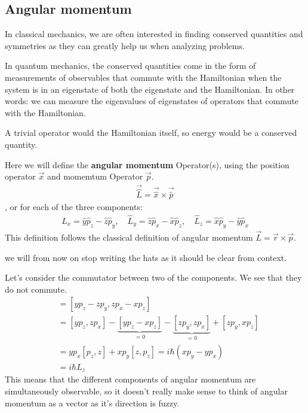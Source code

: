 \subsection{Angular momentum}
In classical mechanics, we are often interested in finding conserved quantities and symmetries as they can greatly help us when analyzing problems.

In quantum mechanics, the conserved quantities come in the form of measurements of observables that commute with the Hamiltonian when the system is in an eigenstate of both the eigenstate and the Hamiltonian.
In other words: we can measure the eigenvalues of eigenstates of operators that commute with the Hamiltonian.

A trivial operator would the Hamiltonian itself, so energy would be a conserved quantity.


Here we will define the \textbf{angular momentum} Operator(s), using the position operator $\vec{x}$ and momemtum Operator $\vec{p}$. 
\begin{align*}
	\vec{\hat{L}} = \vec{\hat{x}} \times \vec{\hat{p}}
\end{align*}
, or for each of the three components:
\begin{align*}
	\hat{L}_x = \hat{y}\hat{p}_z - \hat{z} \hat{p}_y, \quad \hat{L}_y = \hat{z} \hat{p}_x - \hat{x} \hat{p}_z, \quad \hat{L}_z = \hat{x} \hat{p}_y - \hat{y} \hat{p}_x
\end{align*}
This definition follows the classical definition of angular momentum $\vec{L} = \vec{r} \times \vec{p}$.

we will from now on stop writing the hats as it should be clear from context.

Let's consider the commutator between two of the components. We see that they do not commute.
\begin{align*}
	[L_x,L_y] &= [yp_z - zp_y, zp_x - xp_z]\\
						&= [yp_z, z p_x]
						- \underbrace{[yp_z - xp_z]}_{=0}
					- \underbrace{[zp_y, zp_x]}_{=0}
						+ [zp_y,xp_z]\\
						&= yp_x[p_z,z] + xp_y[z,p_z] = i \hbar (xp_y - y p_x)\\
						&= i \hbar L_z
\end{align*}
This means that the different components of angular momentum are simultaneously observable, so it doesn't really make sense to think of angular momentum as a vector as it's direction is fuzzy.

